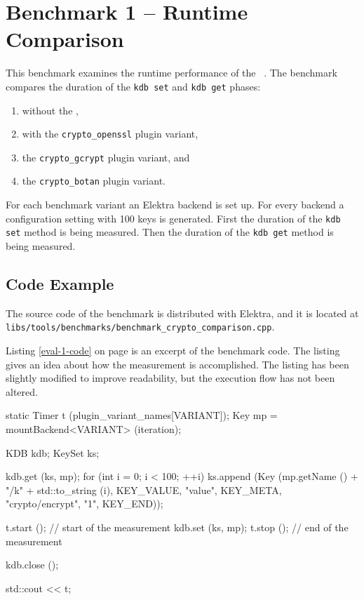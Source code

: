 
\section{Benchmark 1 -- Runtime Comparison}

This benchmark examines the runtime performance of the \crypto ~.
The benchmark compares the duration of the \texttt{kdb set} and \texttt{kdb get} phases:

\begin{enumerate}
\item without the \crypto ,
\item with the \texttt{crypto\_openssl} plugin variant,
\item the \texttt{crypto\_gcrypt} plugin variant, and 
\item the \texttt{crypto\_botan} plugin variant.
\end{enumerate}

For each benchmark variant an Elektra backend is set up.
For every backend a configuration setting with 100 keys  is generated.
First the duration of the \texttt{kdb set} method is being measured.
Then the duration of the \texttt{kdb get} method is being measured.

  \subsection{Code Example}

The source code of the benchmark is distributed with Elektra, and it is located at\\
\texttt{libs/tools/benchmarks/benchmark\_crypto\_comparison.cpp}.

Listing \ref{eval-1-code} on page \pageref{eval-1-code} is an excerpt of the benchmark code.
The listing gives an idea about how the measurement is accomplished.
The listing has been slightly modified to improve readability, but the execution flow has not been altered.

\begin{code}[label=eval-1-code,language=C,caption={Excerpt of Benchmark 1}]
static Timer t (plugin_variant_names[VARIANT]);
Key mp = mountBackend<VARIANT> (iteration);
{
  KDB kdb;
  KeySet ks;

  kdb.get (ks, mp);
  for (int i = 0; i < 100; ++i)
  {
    ks.append (Key (mp.getName () + "/k" + std::to_string (i),
      KEY_VALUE, "value",
      KEY_META, "crypto/encrypt", "1",
      KEY_END));
  }

  t.start (); // start of the measurement
  kdb.set (ks, mp);
  t.stop (); // end of the measurement

  kdb.close ();
}
std::cout << t;
\end{code}

